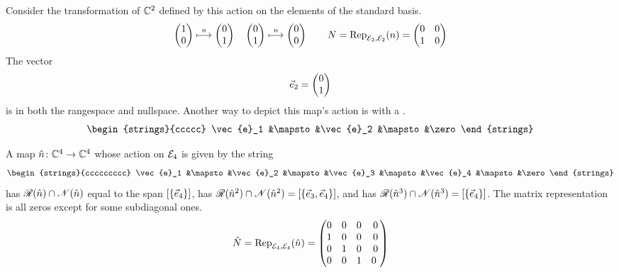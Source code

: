 \begin{example}   \label{FirstNilMap}
Consider the transformation of \( \C^2 \)
defined by this action on the elements of the standard basis.
\begin{equation*}
  \colvec{1 \\ 0}
    \mapsunder{n}
    \colvec{0 \\ 1}
  \quad
  \colvec{0 \\ 1}
    \mapsunder{n}
    \colvec{0 \\ 0}
  \qquad
  N=\rep{n}{\stdbasis_2,\stdbasis_2}=\begin{pmatrix}
    0  &0  \\
    1  &0
  \end{pmatrix}
\end{equation*}
The vector 
\begin{equation*}
  \vec{e}_2=\colvec{0 \\ 1}
\end{equation*}
is in both the rangespace and nullspace.
Another way to depict this map's action is with a 
.
\begin{equation*}
  \begin{strings}{ccccc}
     \vec{e}_1 &\mapsto &\vec{e}_2 &\mapsto &\zero
  \end{strings}
\end{equation*}
\end{example}

\begin{example}  \label{NilIndexFourOnCFour}
A map \( \map{\hat{n}}{\C^4}{\C^4} \)
whose action on \( \stdbasis_4 \) is given by
the string
\begin{equation*}
  \begin{strings}{ccccccccc}
     \vec{e}_1 &\mapsto &\vec{e}_2
          &\mapsto &\vec{e}_3
          &\mapsto &\vec{e}_4
          &\mapsto &\zero
  \end{strings}
\end{equation*}
has
\( \rangespace{\hat{n}}\intersection\nullspace{\hat{n}} \) equal to the 
span \( \spanof{\set{\vec{e}_4}} \),
has \( \rangespace{\hat{n}^2}\intersection\nullspace{\hat{n}^2}=
  \spanof{\set{\vec{e}_3,\vec{e}_4}} \),
and has \( \rangespace{\hat{n}^3}\intersection\nullspace{\hat{n}^3}=
    \spanof{\set{\vec{e}_4}} \).
The matrix representation  is all zeros except for
some subdiagonal ones.
\begin{equation*}
  \hat{N}=\rep{\hat{n}}{\stdbasis_4,\stdbasis_4}
  =\begin{pmatrix}
    0  &0  &0  &0 \\
    1  &0  &0  &0 \\
    0  &1  &0  &0 \\
    0  &0  &1  &0 \
  \end{pmatrix}
\end{equation*}
\end{example}

